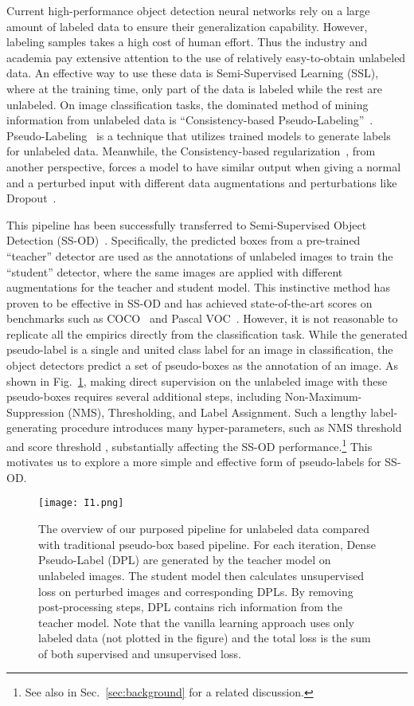 \documentclass[runningheads]{llncs}
\begin{document}
Current high-performance object detection neural networks rely on a large amount of labeled data to ensure their generalization capability. However, labeling samples takes a high cost of human effort. Thus the industry and academia pay extensive attention to the use of relatively easy-to-obtain unlabeled data. An effective way to use these data is Semi-Supervised Learning (SSL), where at the training time, only part of the data is labeled while the rest are unlabeled. On image classification tasks, the dominated method of mining information from unlabeled data is ``Consistency-based Pseudo-Labeling''~\cite{simclr,fixmatch,mixmatch,remixmatch}. Pseudo-Labeling~\cite{pseudolabel} is a technique that utilizes trained models to generate labels for unlabeled data. Meanwhile, the Consistency-based regularization~\cite{consistencyreg}, from another perspective, forces a model to have similar output when giving a normal and a perturbed input with different data augmentations and perturbations like Dropout~\cite{dropout}. 

This pipeline has been successfully transferred to Semi-Supervised Object Detection (SS-OD)~\cite{stac,ubteacher,softteacher}. Specifically, the predicted boxes from a pre-trained ``teacher'' detector are used as the annotations of unlabeled images to train the ``student'' detector, where the same images are applied with different augmentations for the teacher and student model. This instinctive method has proven to be effective in SS-OD and has achieved state-of-the-art scores on benchmarks such as COCO~\cite{coco} and Pascal VOC~\cite{voc}. However, it is not reasonable to replicate all the empirics directly from the classification task. While the generated pseudo-label is a single and united class label for an image in classification, the object detectors predict a set of pseudo-boxes as the annotation of an image. As shown in Fig.~\ref{fig:1}, making direct supervision on the unlabeled image with these pseudo-boxes requires several additional steps, including Non-Maximum-Suppression (NMS), Thresholding, and Label Assignment. Such a lengthy label-generating procedure introduces many hyper-parameters, such as NMS threshold  and score threshold , substantially affecting the SS-OD performance.\footnote{See also in Sec.~\ref{sec:background} for a related discussion.} This motivates us to explore a more simple and effective form of pseudo-labels for SS-OD. 



\begin{figure}[t]
	\centering
	\texttt{[image: I1.png]}
	\caption{The overview of our purposed pipeline for unlabeled data compared with traditional pseudo-box based pipeline. For each iteration, Dense Pseudo-Label (DPL) are generated by the teacher model on unlabeled images. The student model then calculates unsupervised loss on perturbed images and corresponding DPLs. By removing post-processing steps, DPL contains rich information from the teacher model. Note that the vanilla learning approach uses only labeled data (not plotted in the figure) and the total loss is the sum of both supervised and unsupervised loss.  }
	\label{fig:1}
\end{figure}
\end{document}
